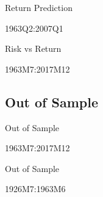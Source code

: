 \documentclass{beamer}
\begin{document}
\begin{frame}{Return Prediction}
	\vspace{-12pt}
	\begin{table}
		\caption{1963Q2:2007Q1}
		\vspace{-18pt}
		\begin{adjustbox}{width=\textwidth,height=3cm}
			
		\end{adjustbox}
	\end{table}
\end{frame}

\begin{frame}{Risk vs Return}
	\vspace{-12pt}
	\begin{table}
		\caption{1963M7:2017M12}
		\vspace{-6pt}
		\begin{adjustbox}{width=11cm,height=4cm}
			
		\end{adjustbox}
	\end{table}
\end{frame}

\subsection{Out of Sample}

\begin{frame}{Out of Sample}
	\vspace{-12pt}
	\begin{table}
		\caption{1963M7:2017M12}
		\vspace{-6pt}
		\begin{adjustbox}{width=\textwidth}
			
		\end{adjustbox}
	\end{table}
\end{frame}

\begin{frame}{Out of Sample}
	\vspace{-12pt}
	\begin{table}
		\caption{1926M7:1963M6}
		\vspace{-6pt}
		\begin{adjustbox}{width=\textwidth}
			
		\end{adjustbox}
	\end{table}
\end{frame}
\end{document}
